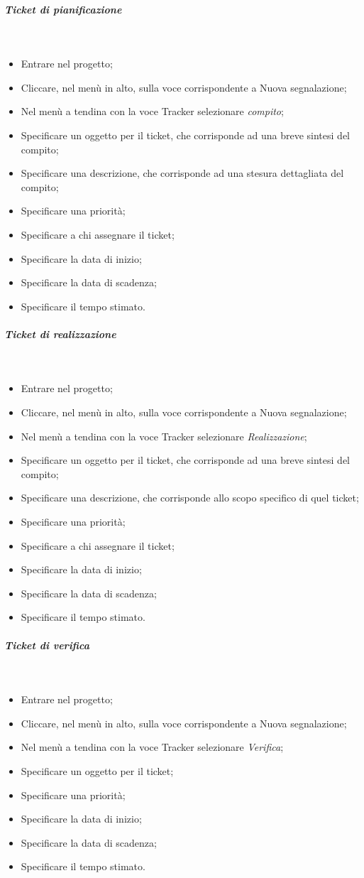 \subparagraph{Ticket di pianificazione} \hfill \\
\begin{itemize}
\item Entrare nel progetto;
\item Cliccare, nel menù in alto, sulla voce corrispondente a Nuova segnalazione;
\item Nel menù a tendina con la voce Tracker selezionare \textit{compito};
\item Specificare un oggetto per il ticket, che corrisponde ad una breve sintesi del compito;
\item Specificare una descrizione, che corrisponde ad una stesura dettagliata del compito;
\item Specificare una priorità;
\item Specificare a chi assegnare il ticket;
\item Specificare la data di inizio;
\item Specificare la data di scadenza;
\item Specificare il tempo stimato.
\end{itemize}

\subparagraph{Ticket di realizzazione} \hfill \\
\begin{itemize}
\item Entrare nel progetto;
\item Cliccare, nel menù in alto, sulla voce corrispondente a Nuova segnalazione;
\item Nel menù a tendina con la voce Tracker selezionare \textit{Realizzazione};
\item Specificare un oggetto per il ticket, che corrisponde ad una breve sintesi del compito;
\item Specificare una descrizione, che corrisponde allo scopo specifico di quel ticket;
\item Specificare una priorità;
\item Specificare a chi assegnare il ticket;
\item Specificare la data di inizio;
\item Specificare la data di scadenza;
\item Specificare il tempo stimato.
\end{itemize}

\subparagraph{Ticket di verifica} \hfill \\
\label{ticket_verifica}
\begin{itemize}
\item Entrare nel progetto;
\item Cliccare, nel menù in alto, sulla voce corrispondente a Nuova segnalazione;
\item Nel menù a tendina con la voce Tracker selezionare \textit{Verifica};
\item Specificare un oggetto per il ticket;
\item Specificare una priorità;
\item Specificare la data di inizio;
\item Specificare la data di scadenza;
\item Specificare il tempo stimato.
\end{itemize}


